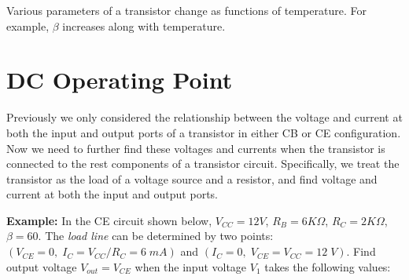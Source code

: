 \documentclass{article}
\begin{document}


Various parameters of a transistor change as functions of temperature. 
For example, $\beta$ increases along with temperature.

\section*{DC Operating Point}

Previously we only considered the relationship between the voltage and 
current at both the input and output ports of a transistor in either CB
or CE configuration. Now we need to further find these voltages and currents
when the transistor is connected to the rest components of a transistor
circuit. Specifically, we treat the transistor as the load of a voltage 
source and a resistor, and find voltage and current at both the input and
output ports.

{\bf Example:} In the CE circuit shown below, $V_{CC}=12V$, $R_B=6 K\Omega$,
$R_C=2 K\Omega$, $\beta=60$. The {\em load line} can be determined by two 
points: $(V_{CE}=0,\;I_C=V_{CC}/R_C=6\;mA)$ and $(I_C=0,\;V_{CE}=V_{CC}=12\;V)$. 
Find output voltage $V_{out}=V_{CE}$ when the input voltage $V_1$ takes the 
following values:

\end{document}
